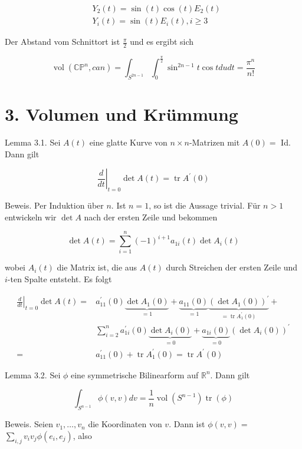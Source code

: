\documentclass[10pt]{article}
\begin{document}
$$
\begin{aligned}
& Y_{2}(t)=\sin (t) \cos (t) E_{2}(t) \\
& Y_{i}(t)=\sin (t) E_{i}(t), i \geq 3
\end{aligned}
$$

Der Abstand vom Schnittort ist $\frac{\pi}{2}$ und es ergibt sich

$$
\operatorname{vol}\left(\mathbb{C P}^{n}, c a n\right)=\int_{S^{2 n-1}} \int_{0}^{\frac{\pi}{2}} \sin ^{2 n-1} t \cos t d u d t=\frac{\pi^{n}}{n!}
$$

\section*{3. Volumen und Krümmung}
Lemma 3.1. Sei $A(t)$ eine glatte Kurve von $n \times n$-Matrizen mit $A(0)=$ Id. Dann gilt

$$
\left.\frac{d}{d t}\right|_{t=0} \operatorname{det} A(t)=\operatorname{tr} A^{\prime}(0)
$$

Beweis. Per Induktion über $n$. Ist $n=1$, so ist die Aussage trivial. Für $n>1$ entwickeln wir $\operatorname{det} A$ nach der ersten Zeile und bekommen

$$
\operatorname{det} A(t)=\sum_{i=1}^{n}(-1)^{i+1} a_{1 i}(t) \operatorname{det} A_{i}(t)
$$

wobei $A_{i}(t)$ die Matrix ist, die aus $A(t)$ durch Streichen der ersten Zeile und $i$-ten Spalte entsteht. Es folgt

$$
\begin{aligned}
\left.\frac{d}{d t}\right|_{t=0} \operatorname{det} A(t)= & a_{11}^{\prime}(0) \underbrace{\operatorname{det} A_{1}(0)}_{=1}+\underbrace{a_{11}(0)}_{=1} \underbrace{\left(\operatorname{det} A_{1}(0)\right)^{\prime}}_{=\operatorname{tr} A_{1}^{\prime}(0)}+ \\
& \sum_{i=2}^{n} a_{1 i}^{\prime}(0) \underbrace{\operatorname{det} A_{i}(0)}_{=0}+\underbrace{a_{1 i}(0)}_{=0}\left(\operatorname{det} A_{i}(0)\right)^{\prime} \\
= & a_{11}^{\prime}(0)+\operatorname{tr} A_{1}^{\prime}(0)=\operatorname{tr} A^{\prime}(0)
\end{aligned}
$$

Lemma 3.2. Sei $\phi$ eine symmetrische Bilinearform auf $\mathbb{R}^{n}$. Dann gilt

$$
\int_{S^{n-1}} \phi(v, v) d v=\frac{1}{n} \operatorname{vol}\left(S^{n-1}\right) \operatorname{tr}(\phi)
$$

Beweis. Seien $v_{1}, \ldots, v_{n}$ die Koordinaten von $v$. Dann ist $\phi(v, v)=$ $\sum_{i, j} v_{i} v_{j} \phi\left(e_{i}, e_{j}\right)$, also
\end{document}
